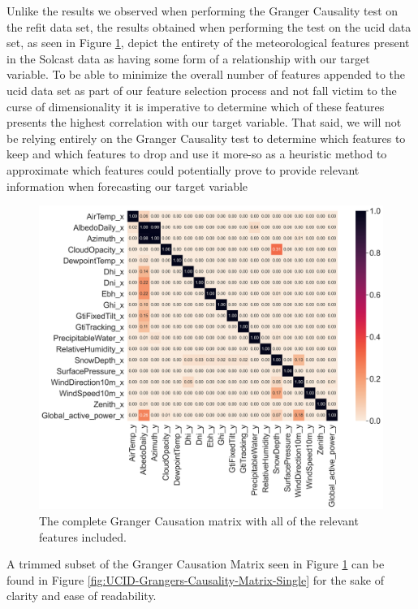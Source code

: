 \noindent Unlike the results we observed when performing the Granger Causality test on the \gls{refit} data set, the results obtained when performing the test on the \gls{ucid} data set, as seen in Figure \ref{fig:UCID-Grangers-Causality-Matrix-All}, depict the entirety of the meteorological features present in the Solcast data as having some form of a relationship with our target variable. To be able to minimize the overall number of features appended to the \gls{ucid} data set as part of our feature selection process and not fall victim to the curse of dimensionality it is imperative to determine which of these features presents the highest correlation with our target variable. That said, we will not be relying entirely on the Granger Causality test to determine which features to keep and which features to drop and use it more-so as a heuristic method to approximate which features could potentially prove to provide relevant information when forecasting our target variable

\begin{figure}[H]
    \centering
    \includegraphics[width=\textwidth]{Images/Chapter 5/UCID/UCID-Grangers-Causality-Matrix.png}
    \caption{The complete Granger Causation matrix with all of the relevant features included.}
    \label{fig:UCID-Grangers-Causality-Matrix-All}
\end{figure}

\noindent A trimmed subset of the Granger Causation Matrix seen in Figure \ref{fig:UCID-Grangers-Causality-Matrix-All} can be found in Figure \ref{fig:UCID-Grangers-Causality-Matrix-Single} for the sake of clarity and ease of readability.

